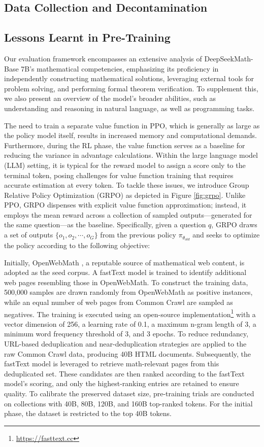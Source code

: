 \subsection{Data Collection and Decontamination}

\subsection{Lessons Learnt in Pre-Training}

Our evaluation framework encompasses an extensive analysis of DeepSeekMath-Base 7B’s mathematical competencies, emphasizing its proficiency in independently constructing mathematical solutions, leveraging external tools for problem solving, and performing formal theorem verification. To supplement this, we also present an overview of the model’s broader abilities, such as understanding and reasoning in natural language, as well as programming tasks.

The need to train a separate value function in PPO, which is generally as large as the policy model itself, results in increased memory and computational demands. Furthermore, during the RL phase, the value function serves as a baseline for reducing the variance in advantage calculations. Within the large language model (LLM) setting, it is typical for the reward model to assign a score only to the terminal token, posing challenges for value function training that requires accurate estimation at every token. To tackle these issues, we introduce Group Relative Policy Optimization (GRPO) as depicted in Figure \ref{fig:grpo}. Unlike PPO, GRPO dispenses with explicit value function approximation; instead, it employs the mean reward across a collection of sampled outputs—generated for the same question—as the baseline. Specifically, given a question $q$, GRPO draws a set of outputs $\{o_1, o_2, \cdots, o_G\}$ from the previous policy $\pi_{\theta_{old}}$ and seeks to optimize the policy according to the following objective:

Initially, OpenWebMath \citep{openwebmath}, a reputable source of mathematical web content, is adopted as the seed corpus. A fastText model \citep{joulin2016fasttext} is trained to identify additional web pages resembling those in OpenWebMath. To construct the training data, 500,000 samples are drawn randomly from OpenWebMath as positive instances, while an equal number of web pages from Common Crawl are sampled as negatives. The training is executed using an open-source implementation\footnote{\url{https://fasttext.cc}} with a vector dimension of 256, a learning rate of 0.1, a maximum n-gram length of 3, a minimum word frequency threshold of 3, and 3 epochs. To reduce redundancy, URL-based deduplication and near-deduplication strategies are applied to the raw Common Crawl data, producing 40B HTML documents. Subsequently, the fastText model is leveraged to retrieve math-relevant pages from this deduplicated set. These candidates are then ranked according to the fastText model's scoring, and only the highest-ranking entries are retained to ensure quality. To calibrate the preserved dataset size, pre-training trials are conducted on collections with 40B, 80B, 120B, and 160B top-ranked tokens. For the initial phase, the dataset is restricted to the top 40B tokens.

